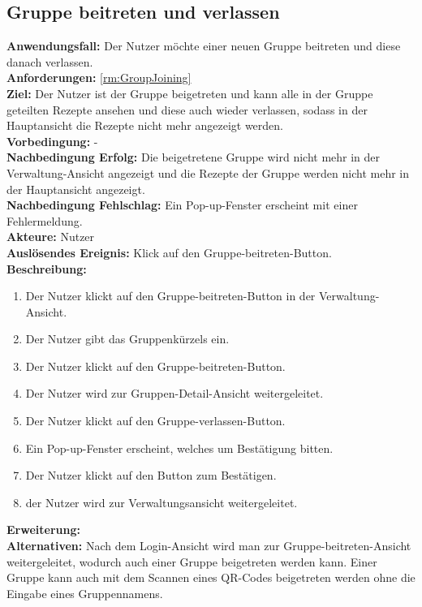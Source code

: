 \documentclass[parskip=full]{scrartcl}
\begin{document}
\subsection{Gruppe beitreten und verlassen}
\textbf{Anwendungsfall:} Der Nutzer möchte einer neuen Gruppe beitreten und diese danach verlassen.\\
\textbf{Anforderungen:} \ref{rm:GroupJoining} \\
\textbf{Ziel:} Der Nutzer ist der Gruppe beigetreten und kann alle in der Gruppe geteilten Rezepte ansehen und diese auch wieder verlassen, sodass in der Hauptansicht die Rezepte nicht mehr angezeigt werden.\\
\textbf{Vorbedingung:} -\\
\textbf{Nachbedingung Erfolg:} Die beigetretene Gruppe wird nicht mehr in der Verwaltung-Ansicht angezeigt und die Rezepte der Gruppe werden nicht mehr in der Hauptansicht angezeigt.\\
\textbf{Nachbedingung Fehlschlag:} Ein Pop-up-Fenster erscheint mit einer Fehlermeldung.\\
\textbf{Akteure:} Nutzer\\
\textbf{Auslösendes Ereignis:} Klick auf den Gruppe-beitreten-Button.\\
\textbf{Beschreibung:}\\
\begin{enumerate}
    \item Der Nutzer klickt auf den Gruppe-beitreten-Button in der Verwaltung-Ansicht.
    \item Der Nutzer gibt das Gruppenkürzels ein.
    \item Der Nutzer klickt auf den Gruppe-beitreten-Button.
    \item Der Nutzer wird zur Gruppen-Detail-Ansicht weitergeleitet.
    \item Der Nutzer klickt auf den Gruppe-verlassen-Button.
    \item Ein Pop-up-Fenster erscheint, welches um Bestätigung bitten.
    \item Der Nutzer klickt auf den Button zum Bestätigen.
    \item der Nutzer wird zur Verwaltungsansicht weitergeleitet.
\end{enumerate}
\textbf{Erweiterung:}\\
\textbf{Alternativen:} Nach dem Login-Ansicht wird man zur Gruppe-beitreten-Ansicht weitergeleitet, wodurch auch einer Gruppe beigetreten werden kann. Einer Gruppe kann auch mit dem Scannen eines QR-Codes beigetreten werden ohne die Eingabe eines Gruppennamens.
\newpage
\end{document}
